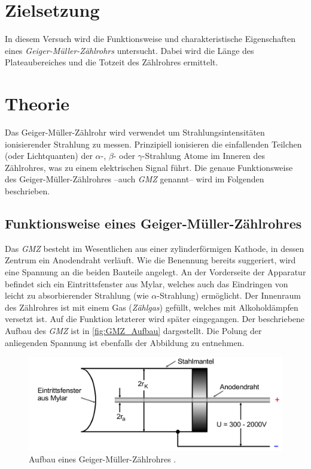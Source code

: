 \section{Zielsetzung}
\label{sec:Ziel}
In diesem Versuch wird die Funktionsweise und charakteristische Eigenschaften eines \textit{Geiger-Müller-Zählrohrs} untersucht. Dabei wird die Länge des Plateaubereiches
und die Totzeit des Zählrohres ermittelt.

\section{Theorie}
\label{sec:Theorie}
Das Geiger-Müller-Zählrohr wird verwendet um Strahlungsintensitäten ionisierender Strahlung zu messen. Prinzipiell ionisieren die einfallenden Teilchen (oder Lichtquanten) der 
$\alpha$-, $\beta$- oder $\gamma$-Strahlung Atome im Inneren des Zählrohres, was zu einem elektrischen Signal führt. Die genaue Funktionsweise des Geiger-Müller-Zählrohres
--auch \textit{GMZ} genannt-- wird im Folgenden beschrieben.

\subsection{Funktionsweise eines Geiger-Müller-Zählrohres}
\label{subsec:Funktion_GMZ}
Das \textit{GMZ} besteht im Wesentlichen aus einer zylinderförmigen Kathode, in dessen Zentrum ein Anodendraht verläuft. Wie die Benennung bereits suggeriert, wird eine Spannung 
an die beiden Bauteile angelegt. An der Vorderseite der Apparatur befindet sich ein Eintrittsfenster aus Mylar, welches auch das Eindringen von leicht zu absorbierender
Strahlung (wie $\alpha$-Strahlung) ermöglicht. Der Innenraum des Zählrohres ist mit einem Gas (\textit{Zählgas}) gefüllt, welches mit Alkoholdämpfen versetzt ist. Auf die Funktion
letzterer wird später eingegangen.
Der beschriebene Aufbau des \textit{GMZ} ist in \autoref{fig:GMZ_Aufbau} dargestellt. Die Polung der anliegenden Spannung ist ebenfalls der Abbildung zu entnehmen.

\begin{figure}
    \centering
    \includegraphics[width = .8\textwidth]{content/GMZ_Aufbau.png}
    \caption{Aufbau eines Geiger-Müller-Zählrohres \cite{v703}.}
    \label{fig:GMZ_Aufbau}
  \end{figure}

